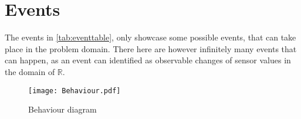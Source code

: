 \section{Events}

The events in \cref{tab:eventtable}, only showcase some possible events, that can take place in the problem domain. There here are however infinitely many events that can happen, as an event can identified as observable changes of sensor values in the domain of $\mathbb{R}$.


\begin{figure}
   \centering
   \begin{adjustbox}{max width=\textwidth}
    \texttt{[image: Behaviour.pdf]}
   \end{adjustbox}
   \caption{Behaviour diagram}
\end{figure}
